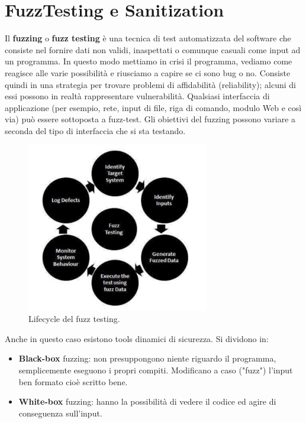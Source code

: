 \chapter{FuzzTesting e Sanitization}

Il \textbf{fuzzing} o \textbf{fuzz testing} è una tecnica di test automatizzata
del software che consiste nel fornire dati non validi, inaspettati o comunque casuali
come input ad un programma. In questo modo mettiamo in crisi il programma,
vediamo come reagisce alle varie possibilità e riusciamo a capire se ci sono bug o no.
Consiste quindi in una strategia per trovare problemi di affidabilità (reliability);
alcuni di essi possono in realtà rappresentare vulnerabilità.
Qualsiasi interfaccia di applicazione (per esempio, rete, input di file, riga di comando,
modulo Web e così via) può essere sottoposta a fuzz-test.
Gli obiettivi del fuzzing possono variare a seconda del tipo di interfaccia che si sta testando.

\begin{figure}[H]
    \centering
    \includegraphics[width=8cm, keepaspectratio]{capitoli/secure_coding/img/cap_7/lifecycle.png}
    \caption{Lifecycle del fuzz testing.}
\end{figure}

Anche in questo caso esistono tools dinamici di sicurezza.
Si dividono in:

\begin{itemize}
    \item \textbf{Black-box} fuzzing: non presuppongono niente riguardo il programma,
          semplicemente eseguono i propri compiti. Modificano a caso ("fuzz") l'input ben formato
          cioè scritto bene.
    \item \textbf{White-box} fuzzing: hanno la possibilità di vedere il codice ed agire di
          conseguenza sull'input.
\end{itemize}

